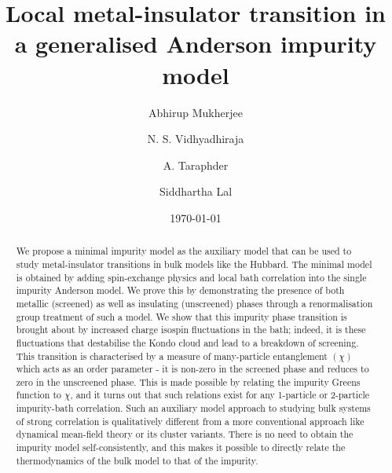 \documentclass[reprint,superscriptaddress,floatfix]{revtex4-2}
\begin{document}
\title{Local metal-insulator transition in a generalised Anderson impurity model}
\author{Abhirup Mukherjee}
\author{N. S. Vidhyadhiraja}
\author{A. Taraphder}
\author{Siddhartha Lal}

\date{\today}

\begin{abstract}
We propose a minimal impurity model as the auxiliary model that can be used to study metal-insulator transitions in bulk models like the Hubbard. The minimal model is obtained by adding spin-exchange physics and local bath correlation into the single impurity Anderson model. We prove this by demonstrating the presence of both metallic (screened) as well as insulating (unscreened) phases through a renormalisation group treatment of such a model. We show that this impurity phase transition is brought about by increased charge isospin fluctuations in the bath; indeed, it is these fluctuations that destabilise the Kondo cloud and lead to a breakdown of screening. This transition is characterised by a measure of many-particle entanglement \(\left(\chi\right)\) which acts as an order parameter - it is non-zero in the screened phase and reduces to zero in the unscreened phase. This is made possible by relating the impurity Greens function to \(\chi\), and it turns out that such relations exist for any 1-particle or 2-particle impurity-bath correlation. Such an auxiliary model approach to studying bulk systems of strong correlation is qualitatively different from a more conventional approach like dynamical mean-field theory or its cluster variants. There is no need to obtain the impurity model self-consistently, and this makes it possible to directly relate the thermodynamics of the bulk model to that of the impurity.
\end{abstract}

\maketitle
\end{document}
